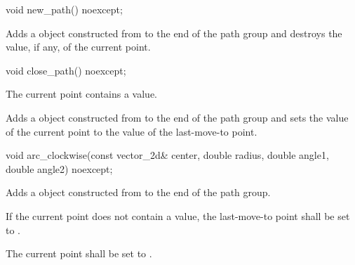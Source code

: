 \begin{itemdecl}
    void new_path() noexcept;
\end{itemdecl}
\begin{itemdescr}
	\pnum
	\effects
	Adds a  object constructed from  to the end of the path group and destroys the value, if any, of the current point.
\end{itemdescr}

\begin{itemdecl}
    void close_path() noexcept;
\end{itemdecl}
\begin{itemdescr}
	\pnum
	\requires
	The current point contains a value.
	
	\pnum
	\effects
	Adds a  object constructed from  to the end of the path group and sets the value of the current point to the value of the last-move-to point.
\end{itemdescr}

\begin{itemdecl}
    void arc_clockwise(const vector_2d& center, double radius, double angle1,
      double angle2) noexcept;
\end{itemdecl}
\begin{itemdescr}
	\pnum
	\effects
	Adds a  object constructed from  to the end of the path group.
	
	\pnum
	If the current point does not contain a value, the last-move-to point shall be set to .
	
	\pnum
	The current point shall be set to .
\end{itemdescr}


